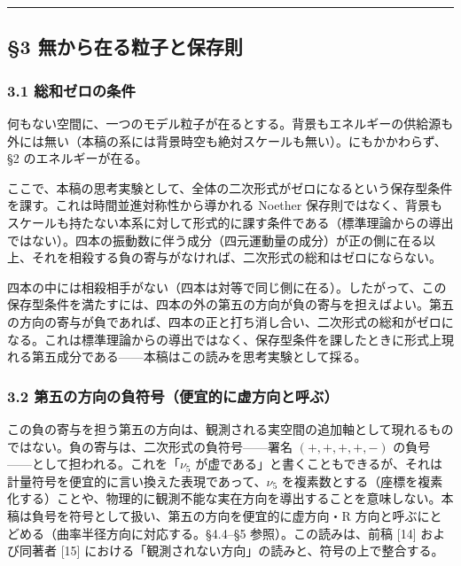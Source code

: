 \documentclass[
]{ltjsarticle}
\begin{document}
\begin{center}\rule{0.5\linewidth}{0.5pt}\end{center}

\subsection{§3
無から在る粒子と保存則}\label{ux7121ux304bux3089ux5728ux308bux7c92ux5b50ux3068ux4fddux5b58ux5247}

\subsubsection{3.1
総和ゼロの条件}\label{ux7dcfux548cux30bcux30edux306eux6761ux4ef6}

何もない空間に、一つのモデル粒子が在るとする。背景もエネルギーの供給源も外には無い（本稿の系には背景時空も絶対スケールも無い）。にもかかわらず、§2
のエネルギーが在る。

ここで、本稿の思考実験として、全体の二次形式がゼロになるという保存型条件を課す。これは時間並進対称性から導かれる
Noether
保存則ではなく、背景もスケールも持たない本系に対して形式的に課す条件である（標準理論からの導出ではない）。四本の振動数に伴う成分（四元運動量の成分）が正の側に在る以上、それを相殺する負の寄与がなければ、二次形式の総和はゼロにならない。

四本の中には相殺相手がない（四本は対等で同じ側に在る）。したがって、この保存型条件を満たすには、四本の外の第五の方向が負の寄与を担えばよい。第五の方向の寄与が負であれば、四本の正と打ち消し合い、二次形式の総和がゼロになる。これは標準理論からの導出ではなく、保存型条件を課したときに形式上現れる第五成分である------本稿はこの読みを思考実験として採る。

\subsubsection{3.2
第五の方向の負符号（便宜的に虚方向と呼ぶ）}\label{ux7b2cux4e94ux306eux65b9ux5411ux306eux8ca0ux7b26ux53f7ux4fbfux5b9cux7684ux306bux865aux65b9ux5411ux3068ux547cux3076}

この負の寄与を担う第五の方向は、観測される実空間の追加軸として現れるものではない。負の寄与は、二次形式の負符号------署名
\((+,+,+,+,-)\) の負号------として担われる。これを「\(\nu_5\)
が虚である」と書くこともできるが、それは計量符号を便宜的に言い換えた表現であって、\(\nu_5\)
を複素数とする（座標を複素化する）ことや、物理的に観測不能な実在方向を導出することを意味しない。本稿は負号を符号として扱い、第五の方向を便宜的に虚方向・R
方向と呼ぶにとどめる（曲率半径方向に対応する。§4.4--§5
参照）。この読みは、前稿 {[}14{]} および同著者 {[}15{]}
における「観測されない方向」の読みと、符号の上で整合する。
\end{document}
